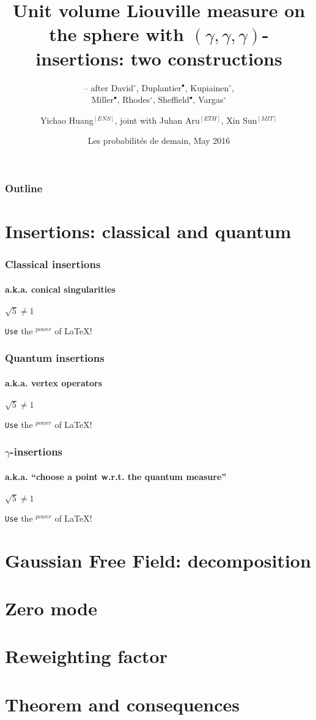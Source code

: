 \documentclass{beamer}
\title[DKRV14 and DMS14]{Unit volume Liouville measure on the sphere with $(\gamma,\gamma,\gamma)$-insertions: two constructions}
\subtitle{-- after David$^\circ$, Duplantier$^\bullet$, Kupiainen$^\circ$,\\Miller$^\bullet$, Rhodes$^\circ$, Sheffield$^\bullet$, Vargas$^\circ$}
\author[Yichao Huang]{Yichao Huang$^{[ENS]}$, joint with Juhan Aru$^{[ETH]}$, Xin Sun$^{[MIT]}$}
\date[IHES, 17 May 2016]{Les probabilit\'es de demain, May 2016}
\begin{document}
\AtBeginSection{\frame{\sectionpage}}

\begin{frame}
\titlepage
\end{frame}

\begin{frame}
\frametitle{Outline}
\tableofcontents
\end{frame}

\section{Insertions: classical and quantum}

\begin{frame}
\frametitle{Classical insertions}
\framesubtitle{a.k.a. conical singularities}

    \begin{center}
        $\sqrt{5} \neq 1$
    \end{center}

    \texttt{Use} the $^{power}$ of \LaTeX!
\end{frame}

\begin{frame}
\frametitle{Quantum insertions}
\framesubtitle{a.k.a. vertex operators}

    \begin{center}
        $\sqrt{5} \neq 1$
    \end{center}

    \texttt{Use} the $^{power}$ of \LaTeX!
\end{frame}

\begin{frame}
\frametitle{$\gamma$-insertions}
\framesubtitle{a.k.a. ``choose a point w.r.t. the quantum measure''}

    \begin{center}
        $\sqrt{5} \neq 1$
    \end{center}

    \texttt{Use} the $^{power}$ of \LaTeX!
\end{frame}

\section{Gaussian Free Field: decomposition}

\section{Zero mode}

\section{Reweighting factor}

\section{Theorem and consequences}
\end{document}
